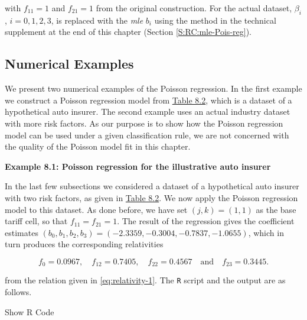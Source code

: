\documentclass[]{book}
\theoremstyle{definition}
\theoremstyle{definition}
\theoremstyle{definition}
\theoremstyle{remark}
\begin{document}
with \(f_{11}=1\) and \(f_{21}=1\) from the original construction. For
the actual dataset, \(\beta_i\), \(i=0,1, 2, 3\), is replaced with the
\emph{mle} \(b_i\) using the method in the technical supplement at the
end of this chapter (Section \ref{S:RC:mle-Pois-reg}).

\subsection{Numerical Examples}\label{numerical-examples}

We present two numerical examples of the Poisson regression. In the
first example we construct a Poisson regression model from
\protect\hyperlink{tab:8.2}{Table 8.2}, which is a dataset of a
hypothetical auto insurer. The second example uses an actual industry
dataset with more risk factors. As our purpose is to show how the
Poisson regression model can be used under a given classification rule,
we are not concerned with the quality of the Poisson model fit in this
chapter.

\textbf{Example 8.1: Poisson regression for the illustrative auto
insurer}

In the last few subsections we considered a dataset of a hypothetical
auto insurer with two risk factors, as given in
\protect\hyperlink{tab:8.2}{Table 8.2}. We now apply the Poisson
regression model to this dataset. As done before, we have set
\((j,k)=(1,1)\) as the base tariff cell, so that \(f_{11}=f_{21}=1\).
The result of the regression gives the coefficient estimates
\((b_0, b_1,b_2,b_3)=(-2.3359, -0.3004, -0.7837, -1.0655 )\), which in
turn produces the corresponding relativities

\begin{equation}
\nonumber
{f}_0=0.0967, \quad {f}_{12}=  0.7405, \quad {f}_{22}=0.4567 \quad \text{and}\quad {f}_{23}=0.3445.
\end{equation}

from the relation given in \eqref{eq:relativity-1}. The \texttt{R} script
and the output are as follows.

Show R Code
\end{document}
